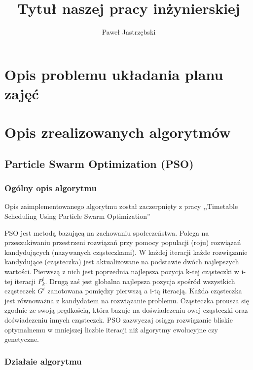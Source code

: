 \documentclass[11pt]{report}
\title{Tytuł naszej pracy inżynierskiej}
\begin{document}
%
%

\maketitle
\tableofcontents


\chapter{Opis problemu układania planu zajęć}





\chapter{Opis zrealizowanych algorytmów}


\section{Particle Swarm Optimization (PSO)}
\author{Paweł Jastrzębski}
\subsection{Ogólny opis algorytmu}
\par Opis zaimplementowanego algorytmu został zaczerpnięty z pracy ,,Timetable Scheduling Using Particle Swarm Optimization'' \cite{pso}
\par PSO jest metodą bazującą na zachowaniu społeczeństwa. Polega na przeszukiwaniu przestrzeni rozwiązań przy pomocy populacji (roju) rozwiązań kandydujących (nazywanych cząsteczkami). W każdej iteracji każde rozwiązanie kandydujące (cząsteczka) jest aktualizowane na podstawie dwóch najlepszych wartości. Pierwszą z nich jest poprzednia najlepsza pozycja k-tej cząsteczki w i-tej iteracji ${P}^{i}_{k}$. Drugą zaś jest globalna najlepsza pozycja spośród wszystkich cząsteczek ${G}^{i}$ zanotowana pomiędzy pierwszą a i-tą iteracją. Każda cząsteczka jest równoważna z kandydatem na rozwiązanie problemu. Cząsteczka prousza się zgodnie ze swoją prędkością, która bazuje na doświadczeniu owej cząsteczki oraz doświadczeniu innych cząsteczek. PSO zazwyczaj osiąga rozwiązanie bliskie optymalnemu w mniejszej liczbie iteracji niż algorytmy ewolucyjne czy genetyczne.  \subsection{Działaie algorytmu}
\end{document}
